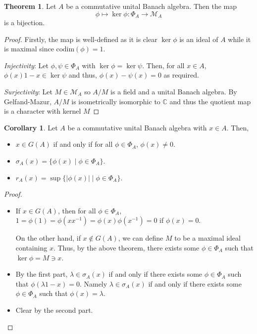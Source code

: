 \documentclass[]{article}
\theoremstyle{definition}
\newtheorem{theorem}{Theorem}
\newtheorem{corollary}{Corollary}[theorem]
\begin{document}
\begin{theorem}
  Let \(A\) be a commutative unital Banach algebra. Then the map 
  \[\phi \mapsto \ker \phi : \Phi_A \to \mathcal{M}_A\]
  is a bijection.
\end{theorem}
\begin{proof}
  Firstly, the map is well-defined as it is clear \(\ker \phi\) is an ideal of \(A\) while 
  it is maximal since \(\text{codim}(\phi) = 1\).

  \textit{Injectivity}: Let \(\phi, \psi \in \Phi_A\) with \(\ker \phi = \ker \psi\). Then, for all 
  \(x \in A\), \(\phi(x)1 - x \in \ker \psi\) and thus, \(\phi(x) - \psi(x) = 0\) as required.

  \textit{Surjectivity}: Let \(M \in \mathcal{M}_A\) so \(A / M\) is a field and a unital Banach algebra.
  By Gelfand-Mazur, \(A / M\) is isometrically isomorphic to \(\mathbb{C}\) and thus the quotient 
  map is a character with kernel \(M\)
\end{proof}

\begin{corollary}
  Let \(A\) be a commutative unital Banach algebra with \(x \in A\). Then,
  \begin{itemize}
    \item \(x \in G(A)\) if and only if for all \(\phi \in \Phi_A\), \(\phi(x) \ne 0\).
    \item \(\sigma_A(x) = \{\phi(x) \mid \phi \in \Phi_A\}\).
    \item \(r_A(x) = \sup \{|\phi(x)| \mid \phi \in \Phi_A\}\).
  \end{itemize}
\end{corollary}
\begin{proof}\(\)\newline
  \begin{itemize}
    \item If \(x \in G(A)\), then for all \(\phi \in \Phi_A\), 
      \(1 = \phi(1) = \phi(x x^{-1}) = \phi(x)\phi(x^{-1}) = 0\) if \(\phi(x) = 0\).

      On the other hand, if \(x \not\in G(A)\), we can define \(M\) to be a maximal ideal containing 
      \(x\). Thus, by the above theorem, there exists some \(\phi \in \Phi_A\) such that \(\ker \phi = M \ni x\).
    \item By the first part, \(\lambda \in \sigma_A(x)\) if and only if there exists some \(\phi \in \Phi_A\)
      such that \(\phi(\lambda 1 - x) = 0\). Namely \(\lambda \in \sigma_A(x)\) if and only if there exists 
      some \(\phi \in \Phi_A\) such that \(\phi(x) = \lambda\).
    \item Clear by the second part.
  \end{itemize}
\end{proof}
\end{document}
